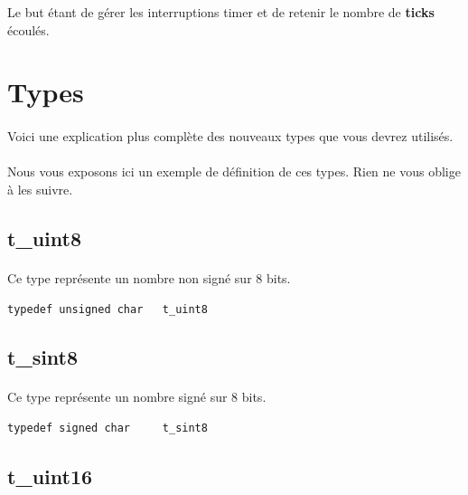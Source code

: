 \documentclass[10pt,a4wide]{article}
\begin{document}
Le but \'etant de g\'erer les interruptions timer et de retenir le nombre
de \textbf{ticks} \'ecoul\'es.

\section{Types}

\paragraph{}

Voici une explication plus compl\`ete des nouveaux types que
vous devrez utilis\'es.

\paragraph{}

Nous vous exposons ici un exemple de d\'efinition de ces types. Rien ne vous
oblige \`a les suivre.

\subsection{t\_uint8}

\paragraph{}

Ce type repr\'esente un nombre non sign\'e sur 8 bits.

\begin{verbatim}
typedef unsigned char   t_uint8
\end{verbatim}

\subsection{t\_sint8}

\paragraph{}

Ce type repr\'esente un nombre sign\'e sur 8 bits.

\begin{verbatim}
typedef signed char     t_sint8
\end{verbatim}

\subsection{t\_uint16}
\end{document}
